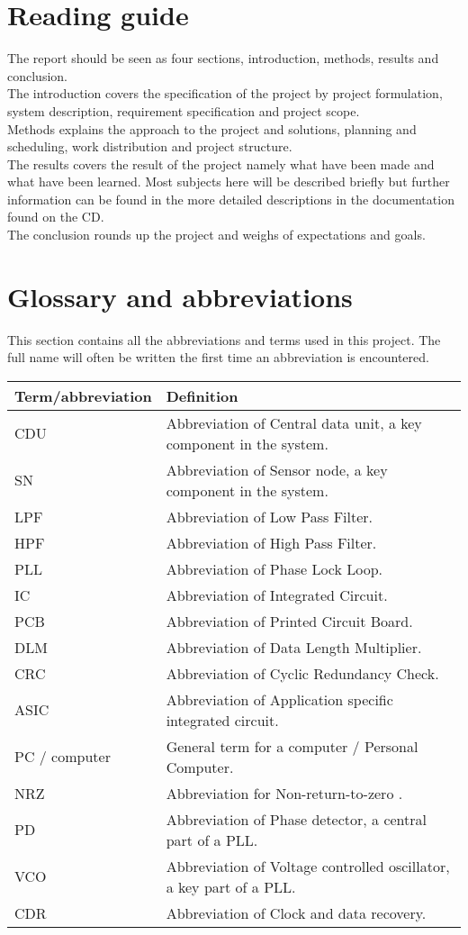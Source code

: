 \section{Reading guide}
The report should be seen as four sections, introduction, methods, results and conclusion.\\
The introduction covers the specification of the project by project formulation, system description, requirement specification and project scope.\\
Methods explains the approach to the project and solutions, planning and scheduling, work distribution and project structure.\\
The results covers the result of the project namely what have been made and what have been learned. Most subjects here will be described briefly but further information can be found in the more detailed descriptions in the documentation found on the CD.\\
The conclusion rounds up the project and weighs of expectations and goals.

\section{Glossary and abbreviations}
This section contains all the abbreviations and terms used in this project. The full name will often be written the first time an abbreviation is encountered.
\begin{table}[H]
\centering
\begin{tabular}{|p{4cm}|p{7cm}|}
\hline
Term/abbreviation & Definition\\ \hline
CDU & Abbreviation of Central data unit, a key component in the system.\\ \hline
SN & Abbreviation of Sensor node, a key component in the system.\\ \hline
LPF & Abbreviation of Low Pass Filter. \\ \hline
HPF & Abbreviation of High Pass Filter. \\ \hline
PLL & Abbreviation of Phase Lock Loop. \\ \hline
IC & Abbreviation of Integrated Circuit. \\ \hline
PCB & Abbreviation of Printed Circuit Board. \\ \hline
DLM & Abbreviation of Data Length Multiplier. \\ \hline
CRC & Abbreviation of Cyclic Redundancy Check. \\ \hline
ASIC & Abbreviation of Application specific integrated circuit.\\ \hline
PC / computer & General term for a computer / Personal Computer.\\ \hline
NRZ & Abbreviation for Non-return-to-zero \cite{WikipediaNRZ}.\\
PD & Abbreviation of Phase detector, a central part of a PLL.\\ \hline
VCO & Abbreviation of Voltage controlled oscillator, a key part of a PLL.\\ \hline
CDR & Abbreviation of Clock and data recovery. \\ \hline
\end{tabular}
\end{table}